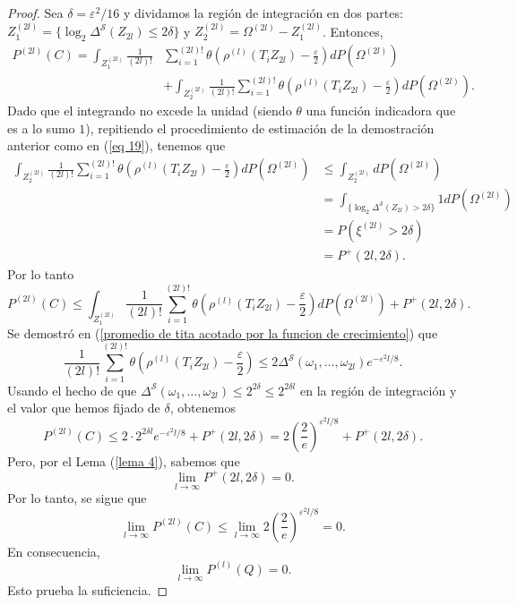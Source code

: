 \documentclass{report}
\begin{document}
\begin{proof}
Sea \( \delta = \varepsilon^2 / 16 \) y dividamos la región de integración en dos partes: 
\( Z_1^{(2l)} = \{ \log_2 \Delta^{\mathcal{S}}(Z_{2l}) \leq 2\delta \} \) y 
\( Z_2^{(2l)} = \Omega^{(2l)} - Z_1^{(2l)} \). Entonces,
\begin{equation*}
    \begin{split}
        P^{(2l)}(C) = \int_{Z_1^{(2l)}} \frac{1}{(2l)!} &\sum_{i=1}^{(2l)!} \theta \left( \rho^{(l)}(T_i Z_{2l}) - \frac{\varepsilon}{2} \right) dP(\Omega^{(2l)})\\
        &+ \int_{Z_2^{(2l)}} \frac{1}{(2l)!} \sum_{i=1}^{(2l)!} \theta \left( \rho^{(l)}(T_i Z_{2l}) - \frac{\varepsilon}{2} \right) dP(\Omega^{(2l)}).
    \end{split}
\end{equation*}
Dado que el integrando no excede la unidad (siendo $\theta$ una función indicadora que es a lo sumo $1$), repitiendo el procedimiento de estimación de la demostración anterior como en
(\ref{eq 19}), tenemos que
\begin{equation*}
    \begin{split}
        \int_{Z_2^{(2l)}} \frac{1}{(2l)!} \sum_{i=1}^{(2l)!} \theta \left( \rho^{(l)}(T_i Z_{2l}) - \frac{\varepsilon}{2} \right) dP(\Omega^{(2l)})
        & \leq \int_{Z_2^{(2l)}} dP(\Omega^{(2l)}) \\
        & =  \int_{\{ \log_2 \Delta^{\mathcal{S}}(Z_{2l}) > 2\delta \}} 1 dP(\Omega^{(2l)})\\
        & = P(\xi^{(2l)} > 2\delta)\\
        & = P^+(2l, 2\delta).
    \end{split}
\end{equation*}
Por lo tanto
\[
P^{(2l)}(C) \leq \int_{Z_1^{(2l)}} \frac{1}{(2l)!} \sum_{i=1}^{(2l)!} \theta \left( \rho^{(l)}(T_i Z_{2l}) - \frac{\varepsilon}{2} \right) dP(\Omega^{(2l)}) + P^+(2l, 2\delta).
\]
Se demostró en (\ref{promedio de tita acotado por la funcion de crecimiento}) que
\[
\frac{1}{(2l)!} \sum_{i=1}^{(2l)!} \theta \left( \rho^{(l)}(T_i Z_{2l}) - \frac{\varepsilon}{2} \right) \leq 2 \Delta^{\mathcal{S}}(\omega_1, \dots, \omega_{2l}) e^{-\varepsilon^2 l / 8}.
\]
Usando el hecho de que \( \Delta^{\mathcal{S}}(\omega_1, \dots, \omega_{2l}) \leq 2^{2\delta} \leq 2^{2\delta l} \) en la región de integración y el valor que hemos
fijado de $\delta$, obtenemos
\[
P^{(2l)}(C) \leq 2 \cdot 2^{2\delta l} e^{-\varepsilon^2 l / 8} + P^+(2l, 2\delta) = 2\left(\frac{2}{e}\right)^{\varepsilon^2 l / 8} + P^+(2l, 2\delta).
\]
Pero, por el Lema (\ref{lema 4}), sabemos que
\[ 
\lim_{l \to \infty} P^+(2l, 2\delta) = 0 .
\]
Por lo tanto, se sigue que 
\[ 
    \lim_{l \to \infty} P^{(2l)}(C) \leq \lim_{l \to \infty}  2\left(\frac{2}{e}\right)^{\varepsilon^2 l / 8}= 0. 
\] 
En consecuencia, 
\[ \lim_{l \to \infty} P^{(l)}(Q) = 0. \]
Esto prueba la suficiencia.\newline
\bigbreak


\end{proof}
\end{document}
